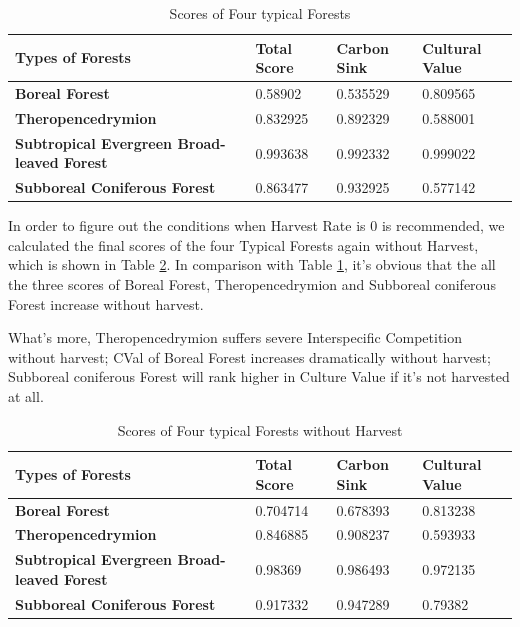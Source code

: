 \documentclass{mcmthesis}
\numberwithin{figure}{section}
\numberwithin{table}{section}
\numberwithin{equation}{section}
\begin{document}
\begin{table}[htpb!]
  \centering
  \caption{Scores of Four typical Forests} \label{ForestScore}
  \begin{tabular}{m{5.5cm}<{\centering}|m{3cm}<{\centering}|m{3cm}<{\centering}|m{3cm}<{\centering}}
  \rowcolor{lightBlue}  \textbf{Types of Forests}&\textbf{Total Score}&\textbf{Carbon Sink}&\textbf{Cultural Value}\\ \hline
  \rowcolor{white} \textbf{Boreal Forest} & 0.58902 & 0.535529 & 0.809565 \\
  \rowcolor{lightBlue} \textbf{Theropencedrymion} &0.832925&0.892329&0.588001 \\
  \rowcolor{white} \textbf{Subtropical Evergreen Broad-leaved Forest} & 0.993638&0.992332 & 0.999022\\
  \rowcolor{lightBlue} \textbf{Subboreal Coniferous Forest} & 0.863477 & 0.932925 &0.577142 \\
  \end{tabular}
\end{table}

In order to figure out the conditions when Harvest Rate is 0 is recommended, 
we calculated the final scores of the four Typical Forests again without Harvest, which 
is shown in Table \ref{ForestScore-NoHarvest}. In comparison with Table \ref{ForestScore}, 
it's obvious that the all the three scores of Boreal Forest, Theropencedrymion and 
Subboreal coniferous Forest increase without harvest. 
\par
What's more, Theropencedrymion suffers severe 
Interspecific Competition without harvest; CVal of Boreal Forest increases dramatically 
without harvest; Subboreal coniferous Forest will rank higher in Culture Value if 
it's not harvested at all.
\par



\begin{table}[htpb!]
  \centering
  \caption{Scores of Four typical Forests without Harvest} \label{ForestScore-NoHarvest}
  \begin{tabular}{m{5.5cm}<{\centering}|m{3cm}<{\centering}|m{3cm}<{\centering}|m{3cm}<{\centering}}
  \rowcolor{lightBlue}  \textbf{Types of Forests}&\textbf{Total Score}&\textbf{Carbon Sink}&\textbf{Cultural Value}\\ \hline
  \rowcolor{white} \textbf{Boreal Forest} & 0.704714 & 0.678393 & 0.813238 \\
  \rowcolor{lightBlue} \textbf{Theropencedrymion} &0.846885&0.908237&0.593933 \\
  \rowcolor{white} \textbf{Subtropical Evergreen Broad-leaved Forest} & 0.98369&0.986493 & 0.972135\\
  \rowcolor{lightBlue} \textbf{Subboreal Coniferous Forest} & 0.917332 & 0.947289 &0.79382 \\
  \end{tabular}
\end{table}
\end{document}
